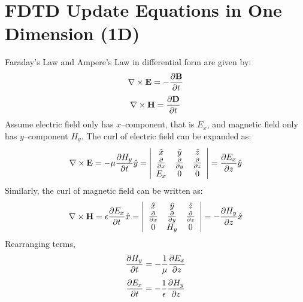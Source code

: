 \section{FDTD Update Equations in One Dimension (1D)}
Faraday's Law and Ampere's Law in differential form are given by:
\begin{equation}
\centering
\nabla \times \textbf{E} = - \dfrac{\partial \textbf{B}}{\partial t}
\label{Faraday's Law}
\end{equation}
\begin{equation}
\centering
\nabla \times \textbf{H} = \dfrac{\partial \textbf{D}}{\partial t}
\label{Ampere's Law}
\end{equation}
Assume electric field only has $x$--component, that is $E_x$, and magnetic field only has $y$--component $H_y$. The curl of electric field can be expanded as:
\begin{equation}
\centering
\nabla \times \textbf{E} = - \mu \dfrac{\partial H_y}{\partial t} \hat{y} = \left| \begin{array}{ccc} \hat{x} & \hat{y} & \hat{z} \\ \frac{\partial}{\partial x} & \frac{\partial}{\partial y} & \frac{\partial}{\partial z} \\ E_x & 0 & 0 \end{array} \right| = \dfrac{\partial E_x}{\partial z} \hat{y}
\label{Faraday's Law-Curl-Expansion}
\end{equation}
Similarly, the curl of magnetic field can be written as:
\begin{equation}
\centering
\nabla \times \textbf{H} = \epsilon \dfrac{\partial E_x}{\partial t} \hat{x} = \left| \begin{array}{ccc} \hat{x} & \hat{y} & \hat{z} \\ \frac{\partial}{\partial x} & \frac{\partial}{\partial y} & \frac{\partial}{\partial z} \\ 0 & H_y & 0 \end{array} \right| = - \dfrac{\partial H_y}{\partial z} \hat{x}
\label{Ampere's Law-Curl-Expansion}
\end{equation}
Rearranging terms,
\begin{equation}
\centering
\dfrac{\partial H_y}{\partial t} = - \dfrac{1}{\mu} \dfrac{\partial E_x}{\partial z}
\label{Faraday's Law-Curl-Expansion-1D}
\end{equation}
\begin{equation}
\centering
\dfrac{\partial E_x}{\partial t} = - \dfrac{1}{\epsilon} \dfrac{\partial H_y}{\partial z}
\label{Ampere's Law-Curl-Expansion-1D}
\end{equation}
